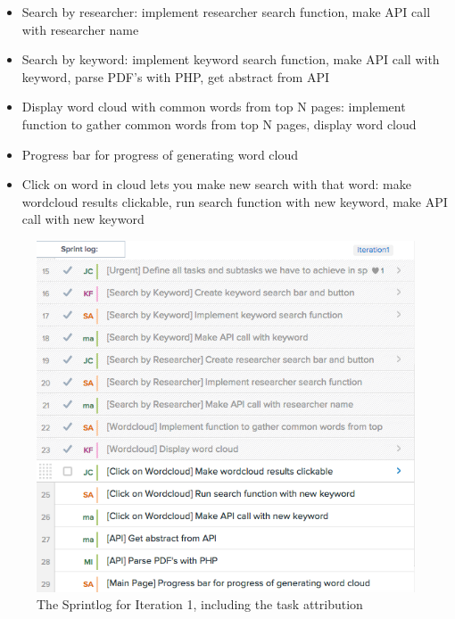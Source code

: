 \documentclass[]{article}
\begin{document}
\begin{itemize}
  \begin{itemize}
  \itemsep1pt\parskip0pt
  \item
    Search by researcher: implement researcher search function, make API
    call with researcher name
  \item
    Search by keyword: implement keyword search function, make API call
    with keyword, parse PDF's with PHP, get abstract from API
  \item
    Display word cloud with common words from top N pages: implement
    function to gather common words from top N pages, display word cloud
  \item
    Progress bar for progress of generating word cloud
  \item
    Click on word in cloud lets you make new search with that word: make
    wordcloud results clickable, run search function with new keyword,
    make API call with new keyword
  \end{itemize}
\end{itemize}

\begin{figure}[htbp]
\centering
\includegraphics{sprintlogv2.png}
\caption{The Sprintlog for Iteration 1, including the task attribution}
\end{figure}
\end{document}
